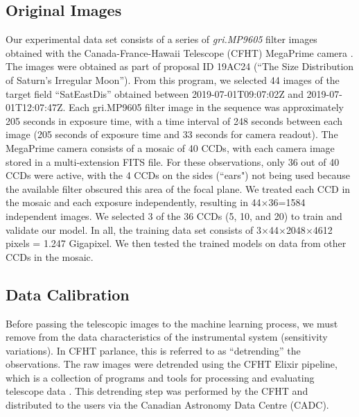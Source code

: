 \subsection{Original Images}
Our experimental data set consists of a series of \textit{gri.MP9605} filter images obtained with the Canada-France-Hawaii Telescope (CFHT) MegaPrime camera \citep{1998SPIE.3355..614B}.
The images were obtained as part of proposal ID 19AC24 (``The Size Distribution of Saturn's Irregular Moon'').
From this program, we selected 44 images of the target field ``SatEastDis'' obtained between 2019-07-01T09:07:02Z and 2019-07-01T12:07:47Z.
Each gri.MP9605 filter image in the sequence was approximately 205 seconds in exposure time, with a time interval of 248 seconds between each image (205 seconds of exposure time and 33 seconds for camera readout).
The MegaPrime camera consists of a mosaic of 40 CCDs, with each camera image stored in a multi-extension FITS file. 
For these observations, only 36 out of 40 CCDs were active, with the 4 CCDs on the sides (``ears") not being used because the available filter obscured this area of the focal plane.
We treated each CCD in the mosaic and each exposure independently, resulting in 44$\times$36=1584 independent images.
We selected 3 of the 36 CCDs (5, 10, and 20) to train and validate our model.
In all, the training data set consists of 3$\times$44$\times$2048$\times$4612 pixels = 1.247 Gigapixel.
We then tested the trained models on data from other CCDs in the mosaic.

\subsection{Data Calibration}
\label{subsect:LSST}
Before passing the telescopic images to the machine learning process, we must remove from the data characteristics of the instrumental system (sensitivity variations).
In CFHT parlance, this is referred to as ``detrending'' the observations.
The raw images were detrended using the CFHT Elixir pipeline, which is a collection of programs and tools for processing and evaluating telescope data \citep{2004PASP..116..449M}.
This detrending step was performed by the CFHT and distributed to the users via the Canadian Astronomy Data Centre (CADC).

